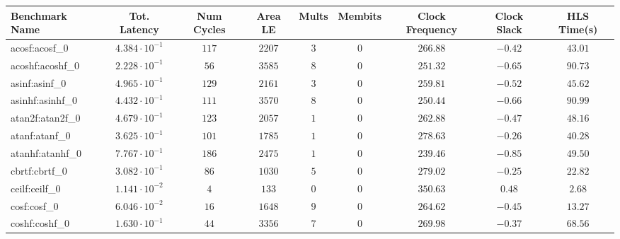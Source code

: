 \begin{tabular}{|l|c|c|c|c|c|c|c|c|}
\hline
Benchmark Name               & Tot. Latency            & Num Cycles & Area LE   & Mults   & Membits & Clock Frequency & Clock Slack & HLS Time(s) \\
\hline
acosf:acosf\_0               & $ 4.384 \cdot 10^{-1} $ & $ 117    $ & $ 2207  $ & $ 3   $ & $ 0   $ & $ 266.88      $ & $ -0.42   $ & $ 43.01   $ \\
acoshf:acoshf\_0             & $ 2.228 \cdot 10^{-1} $ & $ 56     $ & $ 3585  $ & $ 8   $ & $ 0   $ & $ 251.32      $ & $ -0.65   $ & $ 90.73   $ \\
asinf:asinf\_0               & $ 4.965 \cdot 10^{-1} $ & $ 129    $ & $ 2161  $ & $ 3   $ & $ 0   $ & $ 259.81      $ & $ -0.52   $ & $ 45.62   $ \\
asinhf:asinhf\_0             & $ 4.432 \cdot 10^{-1} $ & $ 111    $ & $ 3570  $ & $ 8   $ & $ 0   $ & $ 250.44      $ & $ -0.66   $ & $ 90.99   $ \\
atan2f:atan2f\_0             & $ 4.679 \cdot 10^{-1} $ & $ 123    $ & $ 2057  $ & $ 1   $ & $ 0   $ & $ 262.88      $ & $ -0.47   $ & $ 48.16   $ \\
atanf:atanf\_0               & $ 3.625 \cdot 10^{-1} $ & $ 101    $ & $ 1785  $ & $ 1   $ & $ 0   $ & $ 278.63      $ & $ -0.26   $ & $ 40.28   $ \\
atanhf:atanhf\_0             & $ 7.767 \cdot 10^{-1} $ & $ 186    $ & $ 2475  $ & $ 1   $ & $ 0   $ & $ 239.46      $ & $ -0.85   $ & $ 49.50   $ \\
cbrtf:cbrtf\_0               & $ 3.082 \cdot 10^{-1} $ & $ 86     $ & $ 1030  $ & $ 5   $ & $ 0   $ & $ 279.02      $ & $ -0.25   $ & $ 22.82   $ \\
ceilf:ceilf\_0               & $ 1.141 \cdot 10^{-2} $ & $ 4      $ & $ 133   $ & $ 0   $ & $ 0   $ & $ 350.63      $ & $ 0.48    $ & $ 2.68    $ \\
cosf:cosf\_0                 & $ 6.046 \cdot 10^{-2} $ & $ 16     $ & $ 1648  $ & $ 9   $ & $ 0   $ & $ 264.62      $ & $ -0.45   $ & $ 13.27   $ \\
coshf:coshf\_0               & $ 1.630 \cdot 10^{-1} $ & $ 44     $ & $ 3356  $ & $ 7   $ & $ 0   $ & $ 269.98      $ & $ -0.37   $ & $ 68.56   $ \\

\end{tabular}
